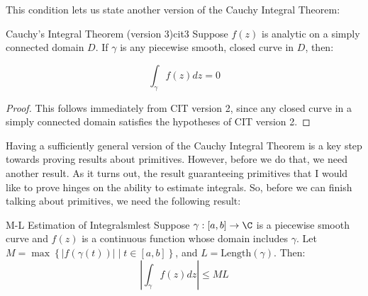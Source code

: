 This condition lets us state another version of the Cauchy Integral Theorem:

\begin{thmbo}{Cauchy's Integral Theorem (version 3)}{cit3} Suppose $f(z)$ is analytic on a simply connected domain $D$. If $\gamma$ is any piecewise smooth, closed curve in $D$, then:

$$\int_{\gamma}f(z)dz = 0$$
\end{thmbo}

\begin{proof} This follows immediately from CIT version 2, since any closed curve in a simply connected domain satisfies the hypotheses of CIT version 2.\end{proof}

Having a sufficiently general version of the Cauchy Integral Theorem is a key step towards proving results about primitives. However, before we do that, we need another result. As it turns out, the result guaranteeing primitives that I would like to prove hinges on the ability to estimate integrals. So, before we can finish talking about primitives, we need the following result:

\begin{thmbo}{M-L Estimation of Integrals}{mlest} Suppose $\gamma:[a,b]\rightarrow \C$ is a piecewise smooth curve and $f(z)$ is a continuous function whose domain includes $\gamma$. Let $M = \max\left\{|f(\gamma(t))|\middle|t\in[a,b]\right\}$, and $L = \mathrm{Length}(\gamma)$. Then:
$$\left|\int_{\gamma}f(z)dz\right| \le ML$$
\end{thmbo}

